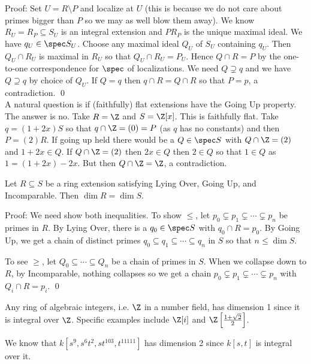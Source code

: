 \noindent Proof: Set $U=R \setminus P$ and localize at $U$ (this is because we do not care about primes bigger than $P$ so we may as well blow them away). We know $R_U=R_P \subseteq S_U$ is an integral extension and $PR_P$ is the unique maximal ideal. We have $q_U \in \spec S_U$. Choose any maximal ideal $Q_U$ of $S_U$ containing $q_U$. Then $Q_U \cap R_U$ is maximal in $R_U$ so that $Q_U \cap R_U =P_U$. Hence $Q \cap R=P$ by the one-to-one correspondence for $\spec$ of localizations. We need $Q \supsetneq q$ and we have $Q \supseteq q$ by choice of $Q_U$. If $Q=q$ then $q \cap R=Q \cap R$ so that $P=p$, a contradiction. \qed \\

A natural question is if (faithfully) flat extensions have the Going Up property. The answer is no. Take $R=\Z$ and $S=\Z[x]$. This is faithfully flat. Take $q=(1+2x)S$ so that $q \cap \Z=(0)=P$ (as $q$ has no constants) and then $P=(2)R$. If going up held there would be a $Q \in \spec S$ with $Q \cap \Z=(2)$ and $1+2x \in Q$. If $Q \cap \Z=(2)$ then $2x \in Q$ then $2 \in Q$ so that $1 \in Q$ as $1=(1+2x)-2x$. But then $Q \cap \Z=\Z$, a contradiction. 

\begin{thmm}
Let $R \subseteq S$ be a ring extension satisfying Lying Over, Going Up, and Incomparable. Then $\dim R=\dim S$. 
\end{thmm}

\noindent Proof: We need show both inequalities. To show $\leq$, let $p_0 \subsetneq p_1 \subsetneq \cdots \subsetneq p_n$ be primes in $R$. By Lying Over, there is a $q_0 \in \spec S$ with $q_0 \cap R =p_0$. By Going Up, we get a chain of distinct primes $q_0 \subseteq q_1 \subseteq \cdots \subseteq q_n$ in $S$ so that $n \leq \dim S$. 

To see $\geq$, let $Q_0 \subseteq \cdots \subseteq Q_n$ be a chain of primes in $S$. When we collapse down to $R$, by Incomparable, nothing collapses so we get a chain $p_0 \subsetneq p_1 \subsetneq \cdots \subsetneq p_n$ with $Q_i \cap R=p_i$. \qed \\

\begin{ex}
Any ring of algebraic integers, i.e. $\Z$ in a number field, has dimension 1 since it is integral over $\Z$. Specific examples include $\Z[i]$ and $\Z\left[\frac{1+\sqrt{2}}{2}\right]$. 
\end{ex} 

\begin{ex}
We know that $k[s^9,s^6t^2,st^{103},t^{11111}]$ has dimension 2 since $k[s,t]$ is integral over it. 
\end{ex}

